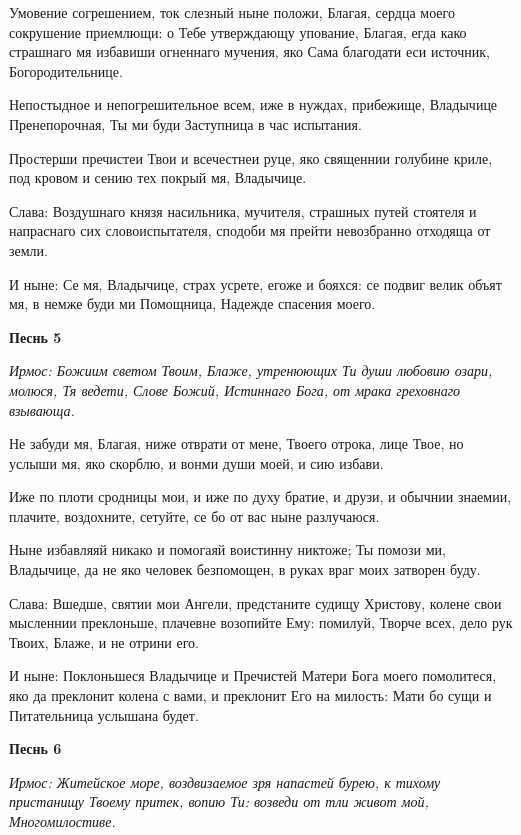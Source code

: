 Умовение согрешением, ток слезный ныне положи, Благая, сердца моего сокрушение приемлющи: о Тебе утверждающу упование, Благая, егда како страшнаго мя избавиши огненнаго мучения, яко Сама благодати еси источник, Богородительнице. 

Непостыдное и непогрешительное всем, иже в нуждах, прибежище, Владычице Пренепорочная, Ты ми буди Заступница в час испытания. 

Простерши пречистеи Твои и всечестнеи руце, яко священнии голубине криле, под кровом и сению тех покрый мя, Владычице. 

Слава: Воздушнаго князя насильника, мучителя, страшных путей стоятеля и напраснаго сих словоиспытателя, сподоби мя прейти невозбранно отходяща от земли. 

И ныне: Се мя, Владычице, страх усрете, егоже и бояхся: се подвиг велик объят мя, в немже буди ми Помощница, Надежде спасения моего.


\medskip


\bfseries Песнь 5\normalfont{}


\itshape Ирмос:\normalfont{} Божиим светом Твоим, Блаже, утренюющих Ти души любовию озари, молюся, Тя ведети, Слове Божий, Истиннаго Бога, от мрака греховнаго взывающа. 

Не забуди мя, Благая, ниже отврати от мене, Твоего отрока, лице Твое, но услыши мя, яко скорблю, и вонми души моей, и сию избави. 

Иже по плоти сродницы мои, и иже по духу братие, и друзи, и обычнии знаемии, плачите, воздохните, сетуйте, се бо от вас ныне разлучаюся. 

Ныне избавляяй никако и помогаяй воистинну никтоже; Ты помози ми, Владычице, да не яко человек безпомощен, в руках враг моих затворен буду. 

Слава: Вшедше, святии мои Ангели, предстаните судищу Христову, колене свои мысленнии преклоньше, плачевне возопийте Ему: помилуй, Творче всех, дело рук Твоих, Блаже, и не отрини его. 

И ныне: Поклоньшеся Владычице и Пречистей Матери Бога моего помолитеся, яко да преклонит колена с вами, и преклонит Его на милость: Мати бо сущи и Питательница услышана будет.


\medskip


\bfseries Песнь 6\normalfont{}


\itshape Ирмос:\normalfont{} Житейское море, воздвизаемое зря напастей бурею, к тихому пристанищу Твоему притек, вопию Ти: возведи от тли живот мой, Многомилостиве. 

